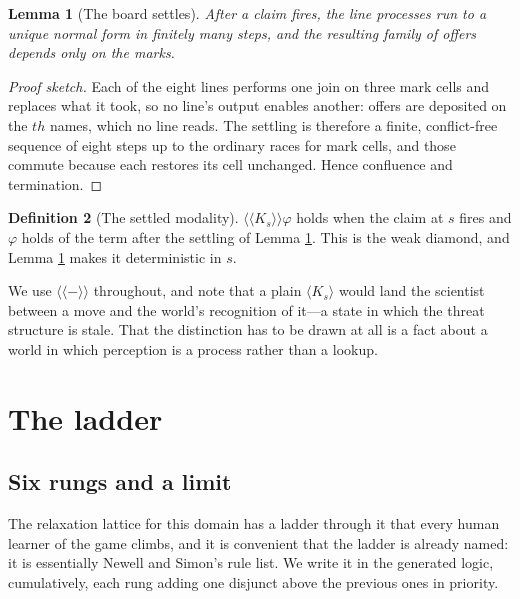 \documentclass[11pt]{article}
\theoremstyle{definition}
\newtheorem{definition}{Definition}
\theoremstyle{plain}
\newtheorem{lemma}[definition]{Lemma}
\theoremstyle{remark}
\begin{document}
\begin{lemma}[The board settles]\label{lem:settle}
After a claim fires, the line processes run to a unique normal form in finitely
many steps, and the resulting family of offers depends only on the marks.
\end{lemma}
\begin{proof}[Proof sketch]
Each of the eight lines performs one join on three mark cells and replaces what
it took, so no line's output enables another: offers are deposited on the
$\mathit{th}$ names, which no line reads. The settling is therefore a finite,
conflict-free sequence of eight steps up to the ordinary races for mark cells,
and those commute because each restores its cell unchanged. Hence confluence and
termination.
\end{proof}

\begin{definition}[The settled modality]
$\langle\!\langle K_s \rangle\!\rangle \varphi$ holds when the claim at $s$
fires and $\varphi$ holds of the term after the settling of Lemma
\ref{lem:settle}. This is the weak diamond, and Lemma \ref{lem:settle} makes it
deterministic in $s$.
\end{definition}

We use $\langle\!\langle - \rangle\!\rangle$ throughout, and note that a plain
$\langle K_s\rangle$ would land the scientist between a move and the world's
recognition of it---a state in which the threat structure is stale. That the
distinction has to be drawn at all is a fact about a world in which perception
is a process rather than a lookup.

\section{The ladder}\label{sec:ladder}

\subsection{Six rungs and a limit}

The relaxation lattice for this domain has a ladder through it that every human
learner of the game climbs, and it is convenient that the ladder is already
named: it is essentially Newell and Simon's rule list. We write it in the
generated logic, cumulatively, each rung adding one disjunct above the previous
ones in priority.
\end{document}
